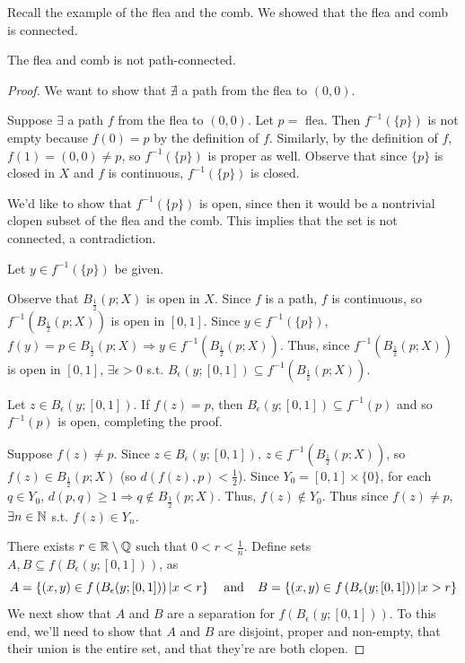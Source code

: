 Recall the example of the flea and the comb. We showed that the flea and comb is connected. 
\begin{theorem}
The flea and comb is not path-connected. 
\end{theorem}
\begin{proof}
We want to show that $\nexists$ a path from the flea to $(0,0)$. 

Suppose $\exists$ a path $f$ from the flea to $(0,0)$. Let $p =$ flea. Then $f^{-1}(\{p\})$ is not empty because $f(0) = p$ by the definition of $f$. Similarly, by the definition of $f$, $f(1) = (0,0) \neq p$, so $f^{-1}(\{p\})$ is proper as well. Observe that since $\{p\}$ is closed in $X$ and $f$ is continuous, $f^{-1}(\{p\})$ is closed.

We'd like to show that $f^{-1}(\{p\})$ is open, since then it would be a nontrivial clopen subset of the flea and the comb. This implies that the set is not connected, a contradiction.

Let $y \in f^{-1}(\{p\})$ be given. 

Observe that $B_{\frac{1}{2}}(p; X)$ is open in $X$. Since $f$ is a path, $f$ is continuous, so $f^{-1}(B_{\frac{1}{2}}(p; X))$ is open in $[0,1]$. Since $y \in f^{-1}(\{p\})$, $f(y) = p \in B_{\frac{1}{2}}(p; X) \Rightarrow y \in f^{-1}(B_{\frac{1}{2}}(p; X))$. Thus, since $f^{-1}(B_{\frac{1}{2}}(p; X))$ is open in $[0,1]$, $\exists \epsilon > 0$ s.t. $B_{\epsilon}(y; [0,1]) \subseteq f^{-1}(B_{\frac{1}{2}}(p; X))$.

Let $z \in B_{\epsilon}(y; [0,1])$. If $f(z) = p$, then $B_{\epsilon}(y; [0,1]) \subseteq f^{-1}(p)$ and so $f^{-1}(p)$ is open, completing the proof.

Suppose $f(z) \neq p$. Since $z \in B_{\epsilon}(y; [0,1])$, $z \in f^{-1}(B_{\frac{1}{2}}(p; X))$, so $f(z) \in B_{\frac{1}{2}}(p; X)$ (so $d(f(z), p) < \frac{1}{2}$). Since $Y_0 = [0,1] \times \{0\}$, for each $q \in Y_0$, $d(p,q) \geq 1 \Rightarrow q \not\in B_{\frac{1}{2}}(p; X)$. Thus, $f(z) \not\in Y_0$. Thus since $f(z) \neq p$, $\exists n \in \mathbb N$ s.t. $f(z) \in Y_n$.

There exists $r\in \mathbb R\setminus\mathbb Q$ such that $0 < r < \frac{1}{n}$. Define sets $A, B\subseteq f\left( B_{\epsilon} (y;[0,1]) \right)$, as
\[A = \left\{ (x,y)\in f\left( B_{\epsilon} (y;[0,1]) \right) | x< r\right\} \hspace{.15in} \text{and} \hspace{.15in} B = \left\{ (x,y)\in f\left( B_{\epsilon} (y;[0,1]) \right) | x> r\right\}\]
We next show that $A$ and $B$ are a separation for $f\left( B_{\epsilon} (y;[0,1]) \right)$. To this end, we'll need to show that $A$ and $B$ are disjoint, proper and non-empty, that their union is the entire set, and that they're are both clopen.


\end{proof}
